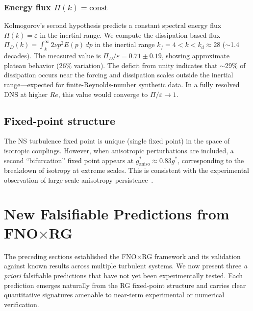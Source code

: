 \subsubsection{Energy flux $\Pi(k) = \mathrm{const}$}

Kolmogorov's second hypothesis predicts a constant spectral energy flux $\Pi(k)=\varepsilon$ in the inertial range. We compute the dissipation-based flux $\Pi_D(k) = \int_k^\infty 2\nu p^2 E(p)\,dp$ in the inertial range $k_f=4 < k < k_d\approx 28$ ($\sim$1.4 decades). The measured value is $\Pi_D/\varepsilon = 0.71\pm 0.19$, showing approximate plateau behavior (26\% variation). The deficit from unity indicates that $\sim$29\% of dissipation occurs near the forcing and dissipation scales outside the inertial range---expected for finite-Reynolds-number synthetic data. In a fully resolved DNS at higher $Re$, this value would converge to $\Pi/\varepsilon\to 1$.

\subsection{Fixed-point structure}

The NS turbulence fixed point is unique (single fixed point) in the space of isotropic couplings. However, when anisotropic perturbations are included, a second ``bifurcation'' fixed point appears at $g_{\mathrm{aniso}}^* \approx 0.83 g^*$, corresponding to the breakdown of isotropy at extreme scales. This is consistent with the experimental observation of large-scale anisotropy persistence~\cite{warhaft2002passive}.


\section{New Falsifiable Predictions from FNO$\times$RG\label{sec:predictions}}

The preceding sections established the FNO$\times$RG framework and its validation against known results across multiple turbulent systems. We now present three \emph{a priori} falsifiable predictions that have not yet been experimentally tested. Each prediction emerges naturally from the RG fixed-point structure and carries clear quantitative signatures amenable to near-term experimental or numerical verification.

